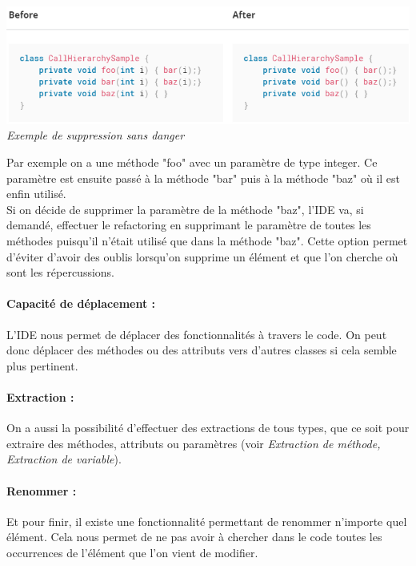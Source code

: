 \documentclass[a4paper,twoside,12pt,openright]{report}
\begin{document}
\begin{center}
\includegraphics[scale=0.8]{Image/SafeDelete.png}\\
\itshape{Exemple de suppression sans  danger \cite{ref9}}
\end{center}

Par exemple on a une méthode "foo" avec un paramètre de type integer. Ce paramètre est ensuite passé à la méthode "bar" puis à la méthode "baz" où il est enfin utilisé.\\
Si on décide de supprimer la paramètre de la méthode "baz", l'IDE va, si demandé, effectuer le refactoring en supprimant le paramètre de toutes les méthodes puisqu'il n'était utilisé que dans la méthode "baz".
Cette option permet d'éviter d'avoir des oublis lorsqu'on supprime un élément et que l'on cherche où sont les répercussions.\\

\paragraph{Capacité de déplacement :}
L'IDE nous permet de déplacer des fonctionnalités à travers le code. On peut donc déplacer des méthodes ou des attributs vers d'autres classes si cela semble plus pertinent.\\

\paragraph{Extraction :}
On a aussi la possibilité d'effectuer des extractions de tous types, que ce soit pour extraire des méthodes, attributs ou paramètres (voir \textit{Extraction de méthode, Extraction de variable}).\\

\paragraph{Renommer :}
Et pour finir, il existe une fonctionnalité permettant de renommer n'importe quel élément. Cela nous permet de ne pas avoir à chercher dans le code toutes les occurrences de l'élément que l'on vient de modifier.\\
\end{document}
